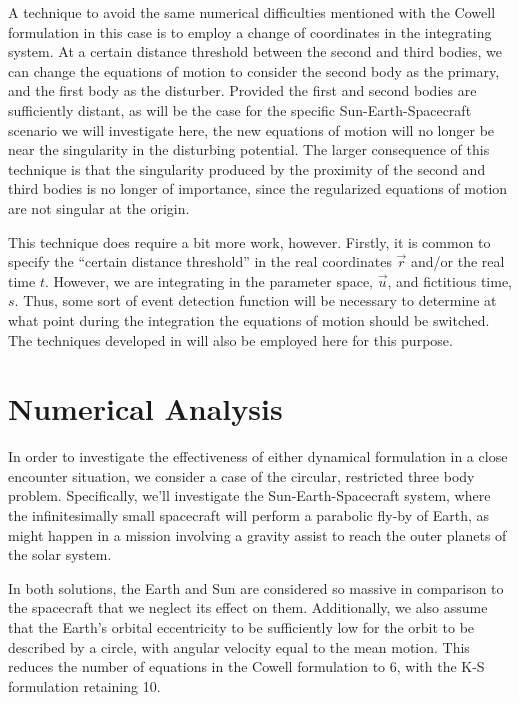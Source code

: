 \documentclass[11pt,twoside,letterpaper]{article}
\begin{document}
  A technique to avoid the same numerical difficulties mentioned with
  the Cowell formulation in this case is to employ a change of
  coordinates in the integrating system. At a certain distance
  threshold between the second and third bodies, we can change the
  equations of motion to consider the second body as the primary, and
  the first body as the disturber. Provided the first and second
  bodies are sufficiently distant, as will be the case for the
  specific Sun-Earth-Spacecraft scenario we will investigate here, the
  new equations of motion will no longer be near the singularity in
  the disturbing potential. The larger consequence of this technique
  is that the singularity produced by the proximity of the second and
  third bodies is no longer of importance, since the regularized
  equations of motion are not singular at the origin.

  This technique does require a bit more work, however. Firstly, it is
  common to specify the ``certain distance threshold'' in the real
  coordinates \(\vec{r}\) and/or the real time \(t\). However, we are
  integrating in the parameter space, \(\vec{u}\), and fictitious
  time, \(s\). Thus, some sort of event detection function will be
  necessary to determine at what point during the integration the
  equations of motion should be switched. The techniques developed in
  \cite{amato_2017} will also be employed here for this purpose.

  \section{Numerical Analysis}
  In order to investigate the effectiveness of either dynamical
  formulation in a close encounter situation, we consider a case of
  the circular, restricted three body problem. Specifically, we'll
  investigate the Sun-Earth-Spacecraft system, where the
  infinitesimally small spacecraft will perform a parabolic fly-by of
  Earth, as might happen in a mission involving a gravity assist to
  reach the outer planets of the solar system.

  In both solutions, the Earth and Sun are considered so massive in
  comparison to the spacecraft that we neglect its effect on
  them. Additionally, we also assume that the Earth's orbital
  eccentricity to be sufficiently low for the orbit to be described by
  a circle, with angular velocity equal to the mean motion. This
  reduces the number of equations in the Cowell formulation to 6, with
  the K-S formulation retaining 10.
\end{document}
